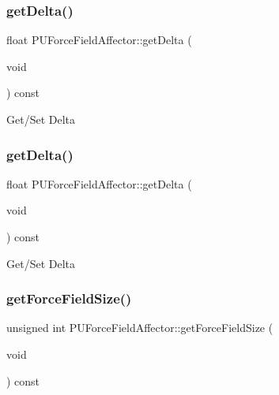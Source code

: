 \subsubsection{\texorpdfstring{get\+Delta()}{getDelta()}\hspace{0.1cm}{\footnotesize\ttfamily [1/2]}}
{\footnotesize\ttfamily float P\+U\+Force\+Field\+Affector\+::get\+Delta (\begin{DoxyParamCaption}\item[{void}]{ }\end{DoxyParamCaption}) const}

Get/\+Set Delta \mbox{\label{classPUForceFieldAffector_a0ba6d06fe458c53af34742842a6e4c79}} 
\subsubsection{\texorpdfstring{get\+Delta()}{getDelta()}\hspace{0.1cm}{\footnotesize\ttfamily [2/2]}}
{\footnotesize\ttfamily float P\+U\+Force\+Field\+Affector\+::get\+Delta (\begin{DoxyParamCaption}\item[{void}]{ }\end{DoxyParamCaption}) const}

Get/\+Set Delta \mbox{\label{classPUForceFieldAffector_a2881115258d19390c08cc9f497d0eba4}} 
\subsubsection{\texorpdfstring{get\+Force\+Field\+Size()}{getForceFieldSize()}\hspace{0.1cm}{\footnotesize\ttfamily [1/2]}}
{\footnotesize\ttfamily unsigned int P\+U\+Force\+Field\+Affector\+::get\+Force\+Field\+Size (\begin{DoxyParamCaption}\item[{void}]{ }\end{DoxyParamCaption}) const}

